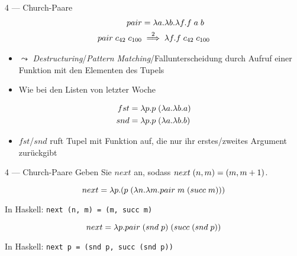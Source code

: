 \documentclass{beamer}
\begin{document}
\newcommand{\reducesTo}[1]{\stackrel{#1}{\implies}}

\begin{frame}{4 --- Church-Paare}
	\begin{eqnarray*}
		pair &= \abs{a}{\abs{b}{\abs{f}{\liiin{f}{a}{b}}}} \\
		\liiin{pair}{c_{42}}{c_{100}} &\reducesTo{2} \abs{f}{\liiin{f}{c_{42}}{c_{100}}}
	\end{eqnarray*}

	\begin{itemize}
		\item $\leadsto$ \emph{Destructuring}/\emph{Pattern Matching}/Fallunterscheidung durch Aufruf einer Funktion mit den Elementen des Tupels
		\item Wie bei den Listen von letzter Woche
	\end{itemize}

	\begin{eqnarray*}
		fst &= \lambda{}p.p\;{}(\lambda{}a.\lambda{}b.a) \\
		snd &= \lambda{}p.p\;{}(\lambda{}a.\lambda{}b.b)
	\end{eqnarray*}

	\begin{itemize}
		\item $fst$/$snd$ ruft Tupel mit Funktion auf, die nur ihr erstes/zweites Argument zurückgibt
	\end{itemize}
\end{frame}

\begin{frame}{4 --- Church-Paare}
	Geben Sie $next$ an, sodass $next\;{}(n, m) = (m, m + 1)$.

	\pause

	\begin{equation*}
		next = \lambda{}p.(p\;{}(\lambda{}n.\lambda{}m.pair\;{}m\;{}(succ\;{}m)))
	\end{equation*}

	In Haskell: \texttt{next (n, m) = (m, succ m)}

	\pause

	\begin{equation*}
		next = \lambda{}p.pair\;{}(snd\;{}p)\;{}(succ\;{}(snd\;{}p))
	\end{equation*}

	In Haskell: \texttt{next p = (snd p, succ (snd p))}
\end{frame}
\end{document}
